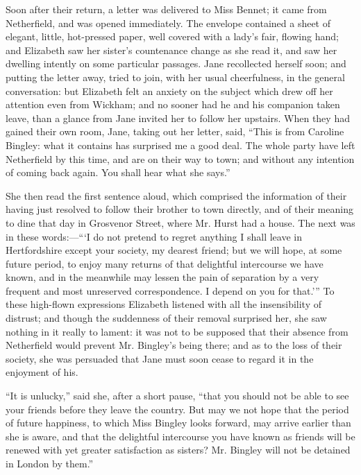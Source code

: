 Soon after their return, a letter was delivered to Miss Bennet; it came from Netherfield, and was opened immediately. The envelope contained a sheet of elegant, little, hot-pressed paper, well covered with a lady's fair, flowing hand; and Elizabeth saw her sister's countenance change as she read it, and saw her dwelling intently on some particular passages. Jane recollected herself soon; and putting the letter away, tried to join, with her usual cheerfulness, in the general conversation: but Elizabeth felt an anxiety on the subject which drew off her attention even from Wickham; and no sooner had he and his companion taken leave, than a glance from Jane invited her to follow her upstairs. When they had gained their own room, Jane, taking out her letter, said, ``This is from Caroline Bingley: what it contains has surprised me a good deal. The whole party have left Netherfield by this time, and are on their way to town; and without any intention of coming back again. You shall hear what she says.''

She then read the first sentence aloud, which comprised the information of their having just resolved to follow their brother to town directly, and of their meaning to dine that day in Grosvenor Street, where Mr. Hurst had a house. The next was in these words:---```I do not pretend to regret anything I shall leave in Hertfordshire except your society, my dearest friend; but we will hope, at some future period, to enjoy many returns of that delightful intercourse we have known, and in the meanwhile may lessen the pain of separation by a very frequent and most unreserved correspondence. I depend on you for that.''' To these high-flown expressions Elizabeth listened with all the insensibility of distrust; and though the suddenness of their removal surprised her, she saw nothing in it really to lament: it was not to be supposed that their absence from Netherfield would prevent Mr. Bingley's being there; and as to the loss of their society, she was persuaded that Jane must soon cease to regard it in the enjoyment of his.

``It is unlucky,'' said she, after a short pause, ``that you should not be able to see your friends before they leave the country. But may we not hope that the period of future happiness, to which Miss Bingley looks forward, may arrive earlier than she is aware, and that the delightful intercourse you have known as friends will be renewed with yet greater satisfaction as sisters? Mr. Bingley will not be detained in London by them.''

